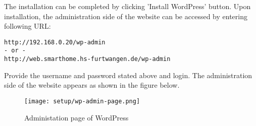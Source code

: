 The installation can be completed by clicking 'Install WordPress' button. Upon installation, the administration side of the website can be accessed by entering following URL:
\begin{lstlisting}
http://192.168.0.20/wp-admin
- or -
http://web.smarthome.hs-furtwangen.de/wp-admin
\end{lstlisting}

Provide the username and password stated above and login. The administration side of the website appears as shown in the figure below.

\begin{figure}[h]
\caption{Administation page of WordPress}
\centering
\texttt{[image: setup/wp-admin-page.png]}
\end{figure}